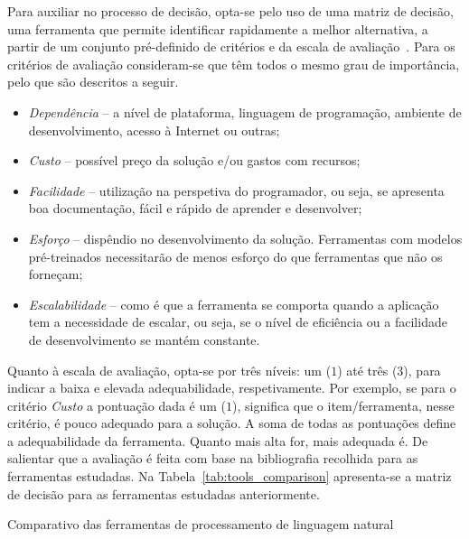 Para auxiliar no processo de decisão, opta-se pelo uso de uma matriz de decisão, uma ferramenta que permite identificar rapidamente a melhor alternativa, a partir de um conjunto pré-definido de critérios e da escala de avaliação~\parencite{decisions_engineering_design}.
Para os critérios de avaliação consideram-se que têm todos o mesmo grau de importância, pelo que são descritos a seguir.

\begin{itemize}
    \item
    {
        \textit{Dependência} -- a nível de plataforma, linguagem de programação, ambiente de desenvolvimento, acesso à Internet ou outras;
    }
    \item
    {
        \textit{Custo} -- possível preço da solução e/ou gastos com recursos;  
    }
    \item
    {
        \textit{Facilidade} -- utilização na perspetiva do programador, ou seja, se apresenta boa documentação, fácil e rápido de aprender e desenvolver;
    }
    \item
    {
        \textit{Esforço} -- dispêndio no desenvolvimento da solução. Ferramentas com modelos pré-treinados necessitarão de menos esforço do que ferramentas que não os forneçam;
    }
    \item
    {
        \textit{Escalabilidade} -- como é que a ferramenta se comporta quando a aplicação tem a necessidade de escalar, ou seja, se o nível de eficiência ou a facilidade de desenvolvimento se mantém constante.
    }
\end{itemize}

Quanto à escala de avaliação, opta-se por três níveis: um ($1$) até três ($3$), para indicar a baixa e elevada adequabilidade, respetivamente. Por exemplo, se para o critério \textit{Custo} a pontuação dada é um ($1$), significa que o item/ferramenta, nesse critério, é pouco adequado para a solução. A soma de todas as pontuações define a adequabilidade da ferramenta. Quanto mais alta for, mais adequada é. De salientar que a avaliação é feita com base na bibliografia recolhida para as ferramentas estudadas. Na Tabela~\ref{tab:tools_comparison} apresenta-se a matriz de decisão para as ferramentas estudadas anteriormente.

\begin{table}[!ht]
\caption{Comparativo das ferramentas de processamento de linguagem natural}
\label{tab:tools_comparison}
\centering
\resizebox{\textwidth}{!}{
\renewcommand{\arraystretch}{1.3}
\footnotesize

}
\end{table}

